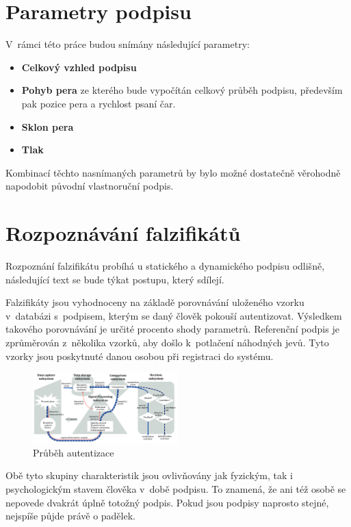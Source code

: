 \newpage

\section{Parametry podpisu}
V~rámci této práce budou snímány následující parametry:
\begin{itemize}
  \item \textbf{Celkový vzhled podpisu}
  \item \textbf{Pohyb pera} ze kterého bude vypočítán celkový průběh podpisu, především pak pozice pera a rychlost psaní čar. %
  \item \textbf{Sklon pera} 
  \item \textbf{Tlak}
\end{itemize}
Kombinací těchto nasnímaných parametrů by bylo možné dostatečně věrohodně napodobit původní vlastnoruční podpis. 

\section{Rozpoznávání falzifikátů}
Rozpoznání falzifikátu probíhá u statického a dynamického podpisu odlišně, následující text se bude týkat postupu, který sdílejí.

Falzifikáty jsou vyhodnoceny na základě porovnávání uloženého vzorku v~databázi s~podpisem, kterým se daný člověk pokouší autentizovat.
Výsledkem takového porovnávání je určité procento shody parametrů.
Referenční podpis je zprůměrován z~několika vzorků, aby došlo k~potlačení náhodných jevů. %
Tyto vzorky jsou poskytnuté danou osobou při registraci do systému.

\begin{figure}[h]
  \centering
  \includegraphics[width=0.5\textwidth]{obrazky-figures/proces_autentizace.png}
  \caption{Průběh autentizace}
  \label{fig:proces_autentizace} %
\end{figure}

Obě tyto skupiny charakteristik jsou ovlivňovány jak fyzickým, tak i psychologickým stavem člověka v~době podpisu.
To znamená, že ani též osobě se nepovede dvakrát úplně totožný podpis.
Pokud jsou podpisy naprosto stejné, nejspíše půjde právě o padělek.

